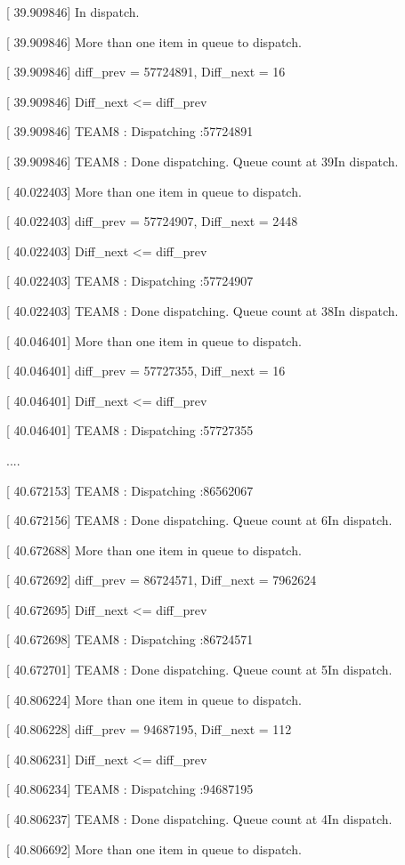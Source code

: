 \documentclass[letterpaper,10pt]{article}
\begin{document}
[   39.909846] In dispatch. 

[   39.909846] More than one item in queue to dispatch.  

[   39.909846] diff\_prev = 57724891, Diff\_next = 16 

[   39.909846] Diff\_next <= diff\_prev 

[   39.909846] TEAM8 : Dispatching :57724891 

[   39.909846] TEAM8 : Done dispatching. Queue count at 39In dispatch. 

[   40.022403] More than one item in queue to dispatch.  

[   40.022403] diff\_prev = 57724907, Diff\_next = 2448 

[   40.022403] Diff\_next <= diff\_prev 

[   40.022403] TEAM8 : Dispatching :57724907 

[   40.022403] TEAM8 : Done dispatching. Queue count at 38In dispatch. 

[   40.046401] More than one item in queue to dispatch.  

[   40.046401] diff\_prev = 57727355, Diff\_next = 16 

[   40.046401] Diff\_next <= diff\_prev 

[   40.046401] TEAM8 : Dispatching :57727355 

....

[   40.672153] TEAM8 : Dispatching :86562067 

[   40.672156] TEAM8 : Done dispatching. Queue count at 6In dispatch. 

[   40.672688] More than one item in queue to dispatch.  

[   40.672692] diff\_prev = 86724571, Diff\_next = 7962624 

[   40.672695] Diff\_next <= diff\_prev 

[   40.672698] TEAM8 : Dispatching :86724571 

[   40.672701] TEAM8 : Done dispatching. Queue count at 5In dispatch. 

[   40.806224] More than one item in queue to dispatch.  

[   40.806228] diff\_prev = 94687195, Diff\_next = 112 

[   40.806231] Diff\_next <= diff\_prev 

[   40.806234] TEAM8 : Dispatching :94687195 

[   40.806237] TEAM8 : Done dispatching. Queue count at 4In dispatch. 

[   40.806692] More than one item in queue to dispatch.  
\end{document}
